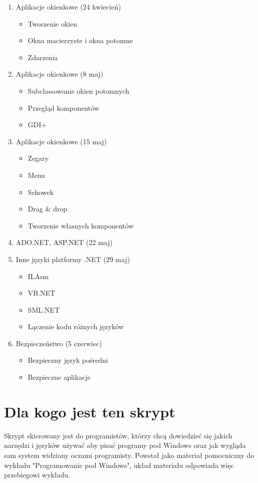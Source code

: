 \begin{enumerate}
\item Aplikacje okienkowe (24 kwiecień)
	\begin{itemize}
	\item Tworzenie okien 
	\item Okna macierzyste i okna potomne
	\item Zdarzenia
	\end{itemize}
\item Aplikacje okienkowe (8 maj)
	\begin{itemize}
	\item Subclassowanie okien potomnych
	\item Przegląd komponentów
	\item GDI+
	\end{itemize}
\item Aplikacje okienkowe (15 maj)
	\begin{itemize}
	\item Zegary
	\item Menu
	\item Schowek
	\item Drag \& drop
	\item Tworzenie własnych komponentów
	\end{itemize}

\item ADO.NET, ASP.NET (22 maj)

\item Inne języki platformy .NET (29 maj)
	\begin{itemize}
	\item ILAsm
	\item VB.NET
	\item SML.NET
	\item Łączenie kodu różnych języków
	\end{itemize}

\item Bezpieczeństwo (5 czerwiec)
	\begin{itemize}
	\item Bezpieczny język pośredni
	\item Bezpieczne aplikacje
	\end{itemize}

\end{enumerate}

\section*{Dla kogo jest ten skrypt}

Skrypt skierowany jest do programistów, którzy chcą dowiedzieć się jakich narzędzi i języków używać
aby pisać programy pod Windows oraz jak wygląda sam system widziany oczami programisty. Powstał jako
materiał pomocniczny do wykładu "Programowanie pod Windows", układ materiału odpowiada więc 
przebiegowi wykładu.

